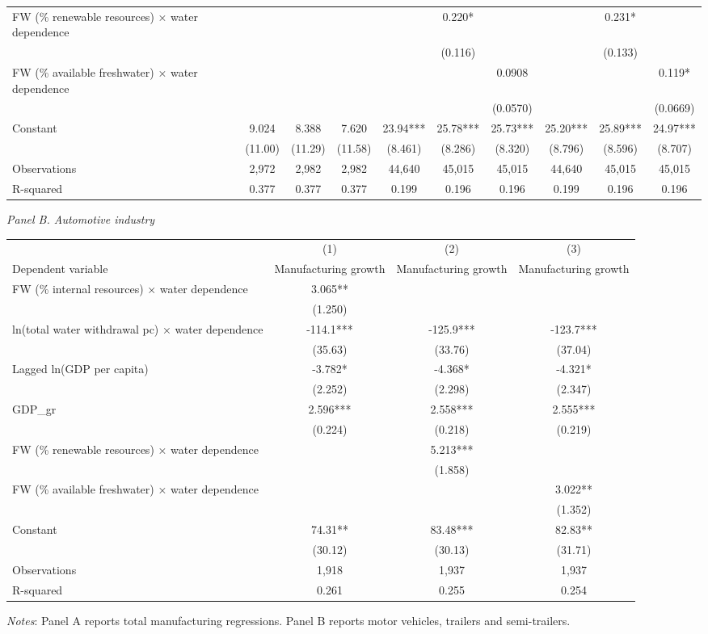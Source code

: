 \begin{table}[htbp]
{\begin{tabular}{lccccccccc}
FW (\% renewable resources) × water dependence &  &  &  &  & 0.220* &  &  & 0.231* &  \\
 &  &  &  &  & (0.116) &  &  & (0.133) &  \\
FW (\% available freshwater) × water dependence &  &  &  &  &  & 0.0908 &  &  & 0.119* \\
 &  &  &  &  &  & (0.0570) &  &  & (0.0669) \\
Constant & 9.024 & 8.388 & 7.620 & 23.94*** & 25.78*** & 25.73*** & 25.20*** & 25.89*** & 24.97*** \\
 & (11.00) & (11.29) & (11.58) & (8.461) & (8.286) & (8.320) & (8.796) & (8.596) & (8.707) \\
\hline
Observations & 2,972 & 2,982 & 2,982 & 44,640 & 45,015 & 45,015 & 44,640 & 45,015 & 45,015 \\
R-squared & 0.377 & 0.377 & 0.377 & 0.199 & 0.196 & 0.196 & 0.199 & 0.196 & 0.196 \\
\hline
\end{tabular}
}
\vspace{0.75em}
\textit{Panel B. Automotive industry}\\
\begin{tabular}{lccc}
\hline
 & (1) & (2) & (3) \\
Dependent variable & Manufacturing growth & Manufacturing growth & Manufacturing growth \\
\hline
FW (\% internal resources) × water dependence & 3.065** &  &  \\
 & (1.250) &  &  \\
ln(total water withdrawal pc) × water dependence & -114.1*** & -125.9*** & -123.7*** \\
 & (35.63) & (33.76) & (37.04) \\
Lagged ln(GDP per capita) & -3.782* & -4.368* & -4.321* \\
 & (2.252) & (2.298) & (2.347) \\
GDP\_gr & 2.596*** & 2.558*** & 2.555*** \\
 & (0.224) & (0.218) & (0.219) \\
FW (\% renewable resources) × water dependence &  & 5.213*** &  \\
 &  & (1.858) &  \\
FW (\% available freshwater) × water dependence &  &  & 3.022** \\
 &  &  & (1.352) \\
Constant & 74.31** & 83.48*** & 82.83** \\
 & (30.12) & (30.13) & (31.71) \\
\hline
Observations & 1,918 & 1,937 & 1,937 \\
R-squared & 0.261 & 0.255 & 0.254 \\
\hline
\end{tabular}
\vspace{0.5em}
\parbox{0.95\textwidth}{\footnotesize \textit{Notes}: Panel A reports total manufacturing regressions. Panel B reports motor vehicles, trailers and semi-trailers.}
\end{table}
